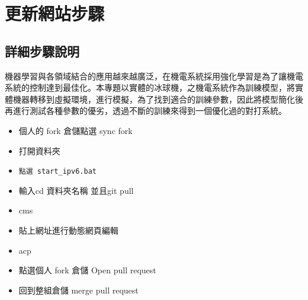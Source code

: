 \chapter{更新網站步驟}
\renewcommand{\baselinestretch}{10.0} %
\setcounter{page}{1}  %
\fontsize{14pt}{2.5pt}\sectionef

\section{詳細步驟說明}
機器學習與各領域結合的應用越來越廣泛，在機電系統採用強化學習是為了讓機電系統的控制達到最佳化。本專題以實體的冰球機，之機電系統作為訓練模型，將實體機器轉移到虛擬環境，進行模擬，為了找到適合的訓練參數，因此將模型簡化後再進行測試各種參數的優劣，透過不斷的訓練來得到一個優化過的對打系統。\\
\begin{itemize}
\item 個人的 fork 倉儲點選 sync fork 
\item 打開資料夾 
\item \texttt{點選 start\_ipv6.bat}
\item 輸入cd 資料夾名稱 並且git pull 
\item cms 
\item 貼上網址進行動態網頁編輯 
\item acp 
\item 點選個人 fork 倉儲 Open pull request 
\item 回到整組倉儲 merge pull request
\end{itemize}

\renewcommand{\baselinestretch}{0.5}

